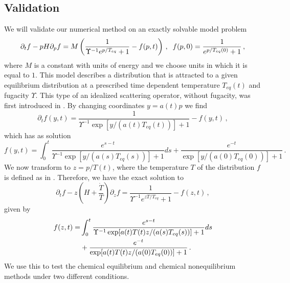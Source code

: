 \subsection{Validation}\label{validation}
We will validate our numerical method on an exactly solvable model problem
\begin{equation}\label{toyEq}
\partial_t f-pH \partial_p f=M\left(\frac{1}{\Upsilon^{-1}e^{p/T_{eq}}+1}-f(p,t)\right)\,, \hspace{2mm} f(p,0)=\frac{1}{e^{p/T_{eq}(0)}+1}\,,
\end{equation}
where $M$ is a constant with units of energy and we choose units in which it is equal to $1$. This model describes a distribution that is attracted to a given equilibrium distribution at a prescribed time dependent temperature $T_{eq}(t)$ and fugacity $\Upsilon$. This type of an idealized scattering operator, without fugacity, was first introduced in \cite{Anderson:1974nyl}. By changing coordinates $y=a(t)p$ we find
\begin{equation}\label{freeStreamToy}
\partial_tf(y,t)=\frac{1}{\Upsilon^{-1}\exp[y/(a(t)T_{eq}(t))]+1}-f(y,t)\,,
\end{equation}
 which has as solution
\begin{equation}\label{exactSol}
f(y,t)=\int_0^t\frac{e^{s-t}}{\Upsilon^{-1}\exp[y/(a(s)T_{eq}(s))]+1}ds+\frac{e^{-t}}{\exp[y/(a(0)T_{eq}(0))]+1}\,.
\end{equation}
We now transform to $z=p/T(t)$, where the temperature $T$ of the distribution $f$ is defined as in . Therefore, we have the exact solution to
\begin{equation}\label{kEqToy}
\partial_tf-z\left(H+\frac{\dot{T}}{T}\right)\partial_zf=\frac{1}{\Upsilon^{-1}e^{zT/T_{eq}}+1}-f(z,t)\,,
\end{equation}
given by
\begin{align}
f(z,t)=&\int_0^t\frac{e^{s-t}}{\Upsilon^{-1}\exp[a(t)T(t)z/(a(s)T_{eq}(s))]+1}ds\\
&+\frac{e^{-t}}{\exp[a(t)T(t)z/(a(0)T_{eq}(0))]+1}\,.\notag
\end{align}
We use this to test the chemical equilibrium and chemical nonequilibrium methods under two different conditions. 

